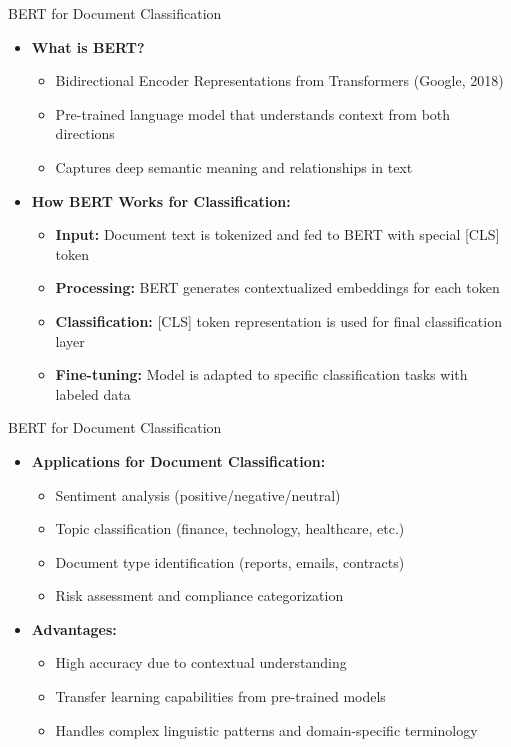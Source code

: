 \documentclass[aspectratio=169]{beamer}
\begin{document}
%
%
\begin{frame}{BERT for Document Classification}
\begin{itemize}
\item \textbf{What is BERT?}
\begin{itemize}
\item Bidirectional Encoder Representations from Transformers (Google, 2018)
\item Pre-trained language model that understands context from both directions
\item Captures deep semantic meaning and relationships in text
\end{itemize}

\item \textbf{How BERT Works for Classification:}
\begin{itemize}
\item \textbf{Input:} Document text is tokenized and fed to BERT with special [CLS] token
\item \textbf{Processing:} BERT generates contextualized embeddings for each token
\item \textbf{Classification:} [CLS] token representation is used for final classification layer
\item \textbf{Fine-tuning:} Model is adapted to specific classification tasks with labeled data
\end{itemize}
\end{itemize}
\end{frame}
%
%
\begin{frame}{BERT for Document Classification}
\begin{itemize}

\item \textbf{Applications for Document Classification:}
\begin{itemize}
\item Sentiment analysis (positive/negative/neutral)
\item Topic classification (finance, technology, healthcare, etc.)
\item Document type identification (reports, emails, contracts)
\item Risk assessment and compliance categorization
\end{itemize}

\item \textbf{Advantages:}
\begin{itemize}
\item High accuracy due to contextual understanding
\item Transfer learning capabilities from pre-trained models
\item Handles complex linguistic patterns and domain-specific terminology
\end{itemize}
\end{itemize}
\end{frame}
\end{document}
